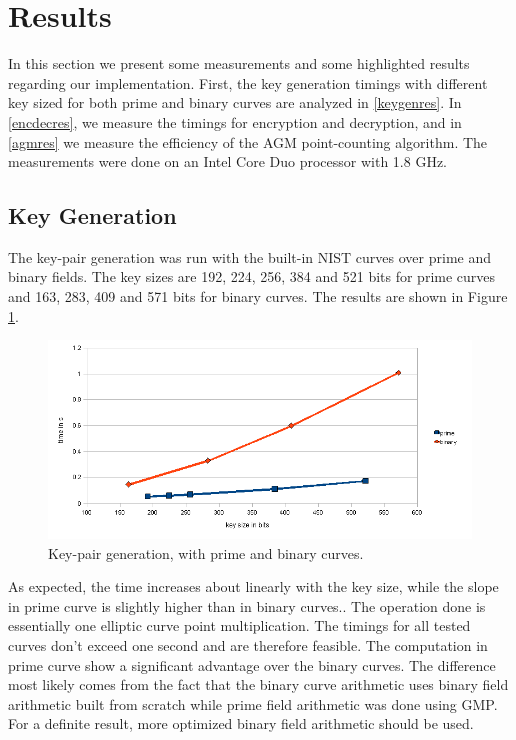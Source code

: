 \documentclass[11pt,english]{article}
\begin{document}
\section{Results}
In this section we present some measurements and some highlighted results regarding our implementation. First, the key generation timings with different key sized for both prime and binary curves are analyzed in \ref{keygenres}. In \ref{encdecres}, we measure the timings for encryption and decryption, and in \ref{agmres} we measure the efficiency of the AGM point-counting algorithm. The measurements were done on an Intel Core Duo processor with 1.8 GHz.

\subsection{Key Generation}
The key-pair generation was run with the built-in NIST curves over prime and binary fields. The key sizes are 192, 224, 256, 384 and 521 bits for prime curves and 163, 283, 409 and 571 bits for binary curves. The results are shown in Figure \ref{figure:keygen}.

\label{keygenres}
\begin{figure}[h]
\centering
\includegraphics[scale=0.6]{keygen.png}
\caption{Key-pair generation, with prime and binary curves.}
\label{figure:keygen}
\end{figure}

As expected, the time increases about linearly with the key size, while the slope in prime curve is slightly higher than in binary curves.. The operation done is essentially one elliptic curve point multiplication. The timings for all tested curves don't exceed one second and are therefore feasible. The computation in prime curve show a significant advantage over the binary curves. The difference most likely comes from the fact that the binary curve arithmetic uses binary field arithmetic built from scratch while prime field arithmetic was done using GMP. For a definite result, more optimized binary field arithmetic should be used.
\end{document}
